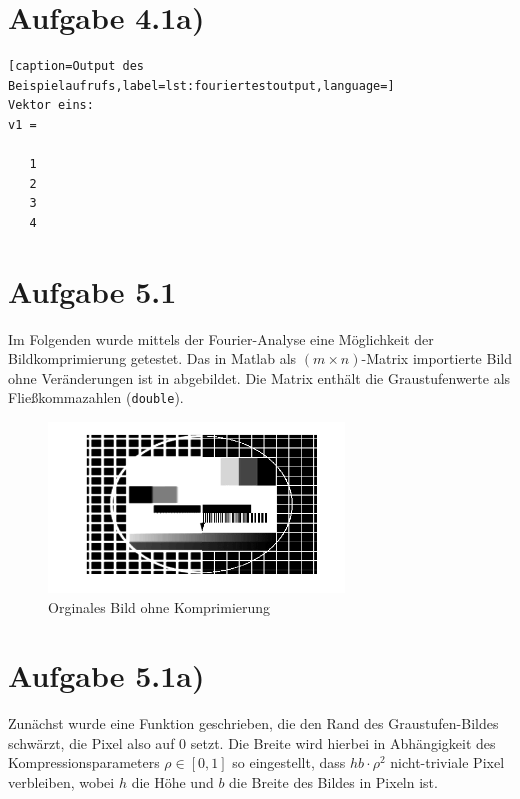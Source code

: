 \section*{Aufgabe 4.1a)}
\begin{lstlisting}[caption=Output des Beispielaufrufs,label=lst:fouriertestoutput,language=]
Vektor eins: 
v1 =

   1
   2
   3
   4
\end{lstlisting}



\section*{Aufgabe 5.1}
Im Folgenden wurde mittels der Fourier-Analyse eine Möglichkeit der Bildkomprimierung
getestet. Das in Matlab als $(m\times n)$-Matrix importierte Bild ohne Veränderungen ist
in  abgebildet. Die Matrix enthält die Graustufenwerte als Fließkommazahlen
(\texttt{double}).

\begin{figure}[htb]
\centering
  \includegraphics[width=0.7\textwidth,keepaspectratio]{../tmp/original}
  \caption{Orginales Bild ohne Komprimierung}
  \label{fig:orig}
\end{figure}

\section*{Aufgabe 5.1a)}

Zunächst wurde eine Funktion  geschrieben, die den Rand des Graustufen-Bildes
schwärzt, die Pixel also auf 0 setzt. Die Breite wird hierbei in Abhängigkeit
des Kompressionsparameters $ρ \in [0,1]$ so eingestellt, dass $hb\cdot ρ^2$
nicht-triviale Pixel verbleiben, wobei $h$ die Höhe und $b$ die Breite des
Bildes in Pixeln ist.



